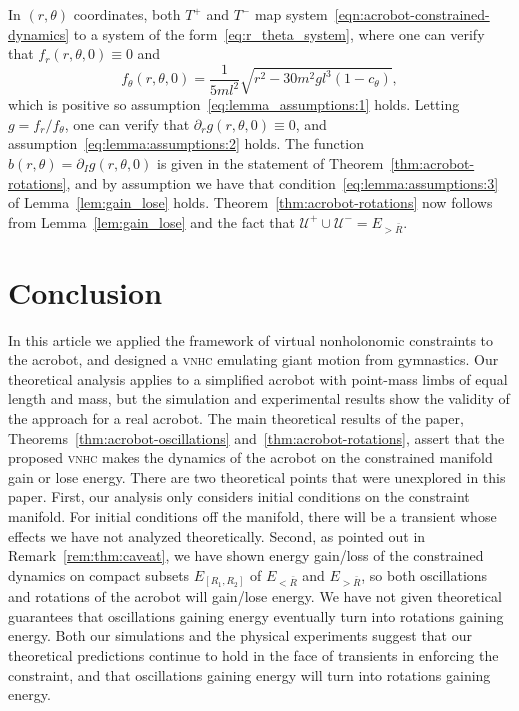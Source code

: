 \documentclass[journal,twoside,web, twocolumn,draftcls]{ieeecolor}
\newcommand*{\cU}{\mathcal{U}}
\newcommand*{\vnhc}{\textsc{vnhc}\xspace}
\begin{document}
In $(r,\theta)$ coordinates, both $T^+$ and $T^-$ map
system~\eqref{eqn:acrobot-constrained-dynamics} to a system of the
form~\eqref{eq:r_theta_system}, where one can verify that
\(f_r(r,\theta,0) \equiv 0\) and
\[
 f_\theta(r,\theta,0) = \frac{1}{5ml^2} \sqrt{r^2 - 30m^2gl^3(1-c_\theta)}
,
\]
which is positive so assumption~\eqref{eq:lemma_assumptions:1} holds. Letting $g
= f_r / f _\theta$, one can verify that \(\partial_r g (r,\theta,0)
\equiv 0\), and assumption~\eqref{eq:lemma:assumptions:2} holds. The function
\(b(r,\theta) = \partial_I g(r,\theta,0)\) is given in the statement
of Theorem~\ref{thm:acrobot-rotations}, and by assumption we have that
condition~\eqref{eq:lemma:assumptions:3} of Lemma~\ref{lem:gain_lose} holds.
Theorem~\ref{thm:acrobot-rotations} now follows from  Lemma~\ref{lem:gain_lose}
and the fact that $\cU^+ \cup \cU^- = E_{>\bar R}$.
\hfill \QED

\section{Conclusion}\label{sec:conclusion}

In this article we applied the framework of virtual nonholonomic constraints to
the acrobot, and designed a \vnhc emulating giant motion from gymnastics. Our
theoretical analysis applies to a simplified acrobot with point-mass limbs of
equal length and mass, but the simulation and experimental results show the
validity of the approach for a real acrobot.  The main theoretical results of
the paper, Theorems~\ref{thm:acrobot-oscillations}
and~\ref{thm:acrobot-rotations}, assert that the proposed \vnhc makes the
dynamics of the acrobot on the constrained manifold gain or lose energy. There
are two theoretical points that were unexplored in this paper. First, our
analysis only considers initial conditions on the constraint manifold. For
initial conditions off the manifold, there will be a transient whose effects we
have not analyzed theoretically. Second, as pointed out in
Remark~\ref{rem:thm:caveat}, we have shown energy gain/loss of the constrained
dynamics on compact subsets $E_{[R_1,R_2]}$ of $E_{<\bar R}$ and $E_{>\bar R}$,
so both oscillations and rotations of the acrobot will gain/lose energy. We have
not given theoretical guarantees that oscillations gaining energy eventually
turn into rotations gaining energy.
Both our simulations and the physical experiments suggest that our theoretical
predictions continue to hold in the face of transients in enforcing the
constraint, and that oscillations gaining energy will turn into rotations
gaining energy.





\end{document}
